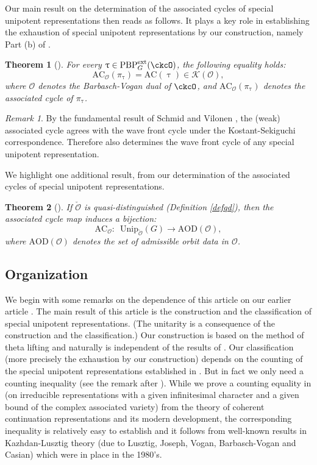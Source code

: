 \documentclass[11pt,a4paper]{amsart}
\newcommand{\AC}{\mathrm{AC}}
\newcommand{\CK}{{\mathcal {K}}}
\newcommand{\CO}{{\mathcal {O}}}
\numberwithin{equation}{section}
\newtheorem{thm}{Theorem}[section]
\theoremstyle{remark}
\newtheorem*{remark}{Remark}
\def\PBPeg{\mathrm{PBP}^{\mathrm{ext}}_{G}}
\def\AC{\mathrm{AC}}
\begin{document}
Our main result on the determination of the associated cycles of special unipotent representations then reads as follows. It plays a key role in establishing the exhaustion of special unipotent representations by our construction, namely Part (b) of .

\begin{thm}[]\label{thmD} For every $\uptau\in \PBPeg(\ckcO)$, the following equality holds:
\[
\AC_\CO(\pi_\uptau)=\AC(\uptau)\in \CK(\CO),
\]
where $\CO$ denotes the Barbasch-Vogan dual of $\ckcO$, and $\AC_\CO(\pi_\uptau)$ denotes the associated cycle of $\pi_\uptau$.
\end{thm}

\begin{remark} By the fundamental result of Schmid and Vilonen \cite{SV}, the (weak) associated cycle agrees with the wave
front cycle under the Kostant-Sekiguchi
correspondence. Therefore  also determines the wave front cycle of any special unipotent representation.
\end{remark}


We highlight one additional result, from our determination of the associated cycles of special unipotent representations.

\begin{thm}[] \label{thmE} If $\check \CO$ is quasi-distinguished (Definition \ref{defqd}), then the associated cycle map induces a bijection:
\[
\mathrm{AC}_{\CO}: \,\,\, \mathrm{Unip}_{\check \CO}(G)\rightarrow  \mathrm{AOD}(\CO),\]
where $\mathrm{AOD}(\CO)$ denotes the set of admissible orbit data in $\CO$.
\end{thm}

\subsection{Organization}\label{subsec:outline}

We begin with some remarks on the dependence of this article on our earlier article \cite{BMSZa}. The main result of this article is the construction and the classification of special unipotent representations. (The unitarity is a consequence of the construction and the classification.) Our construction is based on the method of theta lifting and naturally is independent of the results of \cite{BMSZa}. Our classification (more precisely the exhaustion by our construction) depends on the counting of the special unipotent representations established in \cite{BMSZa}. But in fact we only need a counting inequality (see the remark after ). While we prove a counting equality in \cite{BMSZa} (on irreducible representations with a given infinitesimal character and a given bound of the complex associated variety) from the theory of coherent continuation representations and its modern development, the corresponding inequality is relatively easy to establish and it follows from well-known results in Kazhdan-Lusztig theory (due to Lusztig, Joseph, Vogan, Barbasch-Vogan and Casian) which were in place in  the 1980's.
\end{document}
